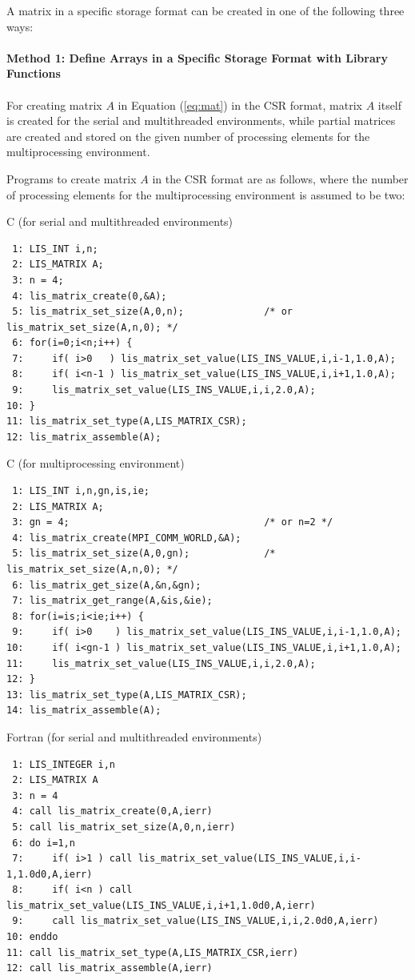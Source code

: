 \documentclass[a4paper]{article}
\begin{document}
A matrix in a specific storage format can be created in one of the
following three ways:\\ \\
\noindent
{\bf Method 1: Define Arrays in a Specific Storage Format with Library Functions}
\\ \\
\indent
For creating matrix $A$ in Equation (\ref{eq:mat}) in the CSR format, 
matrix $A$ itself is created for the serial and multithreaded environments,
while partial matrices are created and 
stored on the given number of processing elements 
for the multiprocessing environment.

Programs to create matrix $A$ in the CSR format are as follows, 
where the number of processing elements for the multiprocessing environment is assumed to be two:
\begin{itemsquarebox}[l]{C (for serial and multithreaded environments)}
\small
\begin{verbatim}
 1: LIS_INT i,n;
 2: LIS_MATRIX A;
 3: n = 4;
 4: lis_matrix_create(0,&A);
 5: lis_matrix_set_size(A,0,n);              /* or lis_matrix_set_size(A,n,0); */ 
 6: for(i=0;i<n;i++) {
 7:     if( i>0   ) lis_matrix_set_value(LIS_INS_VALUE,i,i-1,1.0,A);
 8:     if( i<n-1 ) lis_matrix_set_value(LIS_INS_VALUE,i,i+1,1.0,A);
 9:     lis_matrix_set_value(LIS_INS_VALUE,i,i,2.0,A);
10: }
11: lis_matrix_set_type(A,LIS_MATRIX_CSR);
12: lis_matrix_assemble(A);
\end{verbatim}
\end{itemsquarebox}
\begin{itemsquarebox}[l]{C (for multiprocessing environment)}
\small
\begin{verbatim}
 1: LIS_INT i,n,gn,is,ie;                 
 2: LIS_MATRIX A;
 3: gn = 4;                                  /* or n=2 */
 4: lis_matrix_create(MPI_COMM_WORLD,&A);
 5: lis_matrix_set_size(A,0,gn);             /* lis_matrix_set_size(A,n,0); */
 6: lis_matrix_get_size(A,&n,&gn);
 7: lis_matrix_get_range(A,&is,&ie);
 8: for(i=is;i<ie;i++) {
 9:     if( i>0    ) lis_matrix_set_value(LIS_INS_VALUE,i,i-1,1.0,A);
10:     if( i<gn-1 ) lis_matrix_set_value(LIS_INS_VALUE,i,i+1,1.0,A);
11:     lis_matrix_set_value(LIS_INS_VALUE,i,i,2.0,A);
12: }
13: lis_matrix_set_type(A,LIS_MATRIX_CSR);
14: lis_matrix_assemble(A);
\end{verbatim}
\end{itemsquarebox}
\begin{itemsquarebox}[l]{Fortran (for serial and multithreaded environments)}
\small
\begin{verbatim}
 1: LIS_INTEGER i,n
 2: LIS_MATRIX A
 3: n = 4
 4: call lis_matrix_create(0,A,ierr)
 5: call lis_matrix_set_size(A,0,n,ierr)
 6: do i=1,n
 7:     if( i>1 ) call lis_matrix_set_value(LIS_INS_VALUE,i,i-1,1.0d0,A,ierr)
 8:     if( i<n ) call lis_matrix_set_value(LIS_INS_VALUE,i,i+1,1.0d0,A,ierr)
 9:     call lis_matrix_set_value(LIS_INS_VALUE,i,i,2.0d0,A,ierr)
10: enddo
11: call lis_matrix_set_type(A,LIS_MATRIX_CSR,ierr)
12: call lis_matrix_assemble(A,ierr)
\end{verbatim}
\end{itemsquarebox}
\end{document}
